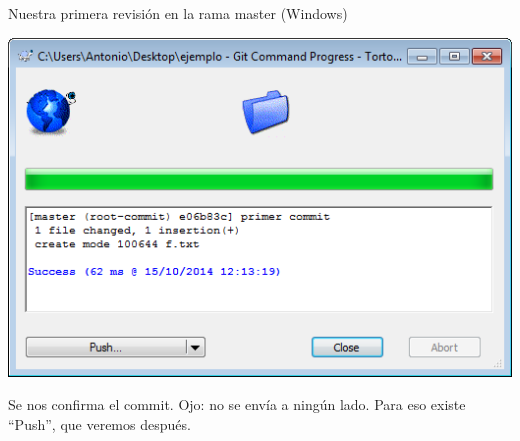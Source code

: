 \documentclass[xcolor=svgnames]{beamer}
\begin{document}
\begin{frame}[t]{Nuestra primera revisión en la rama master (Windows)}
\begin{overprint}
    \begin{center}
      \includegraphics[width=\textwidth,height=.6\textheight,keepaspectratio]{tomas/primercommit-05-okcommit}

      \vfill

      Se nos confirma el commit. \alert{Ojo}: no se envía a ningún lado. Para eso existe ``Push'', que veremos después.
    \end{center}
  \end{overprint}

\end{frame}
\end{document}
